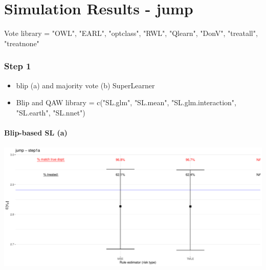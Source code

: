 \documentclass[11pt]{article}\usepackage[]{graphicx}\usepackage[]{color}
\makeatletter
\def\maxwidth{ %
  \ifdim\Gin@nat@width>\linewidth
    \linewidth
  \else
    \Gin@nat@width
  \fi
}
\makeatother
\begin{document}
\part*{Simulation Results - jump}

Vote library = "OWL", "EARL", "optclass", "RWL", "Qlearn", "DonV", "treatall", "treatnone"




\section{Step 1}

\begin{itemize}
\item blip (a) and majority vote (b) SuperLearner
\item Blip and QAW library = c("SL.glm", "SL.mean", "SL.glm.interaction", "SL.earth", "SL.nnet")
\end{itemize}




\subsection{Blip-based SL (a)}

\includegraphics[width=\maxwidth]{figure/ODTR_DGP_jump_step1a-1} 
\begin{table}[ht]
\centering
{}
\caption{jump - step1a} 
\end{table}
\end{document}
